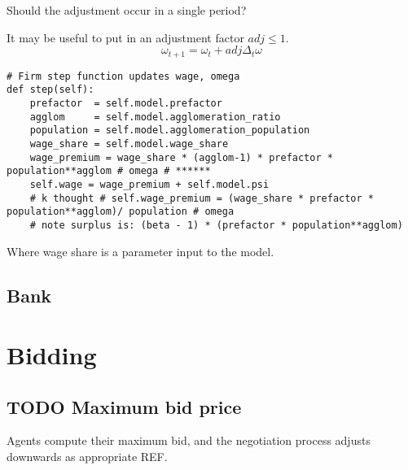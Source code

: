 Should the adjustment occur in a single period?

It may be useful to put in an adjustment factor $adj \le 1$.
\[\omega_{t+1}=\omega_{t} + adj \Delta_t  \omega\]




\begin{lstlisting}
# Firm step function updates wage, omega
def step(self):
    prefactor  = self.model.prefactor
    agglom     = self.model.agglomeration_ratio
    population = self.model.agglomeration_population
    wage_share = self.model.wage_share  
    wage_premium = wage_share * (agglom-1) * prefactor * population**agglom # omega # ****** 
    self.wage = wage_premium + self.model.psi
    # k thought # self.wage_premium = (wage_share * prefactor * population**agglom)/ population # omega    
    # note surplus is: (beta - 1) * (prefactor * population**agglom)
\end{lstlisting}

Where wage share is a parameter input to the model.


\subsection{Bank}\label{Parameters_for_Mortgages}


\section{Bidding}


\subsection{TODO Maximum bid price}

Agents compute their maximum bid, and the negotiation process adjusts downwards as appropriate REF.

